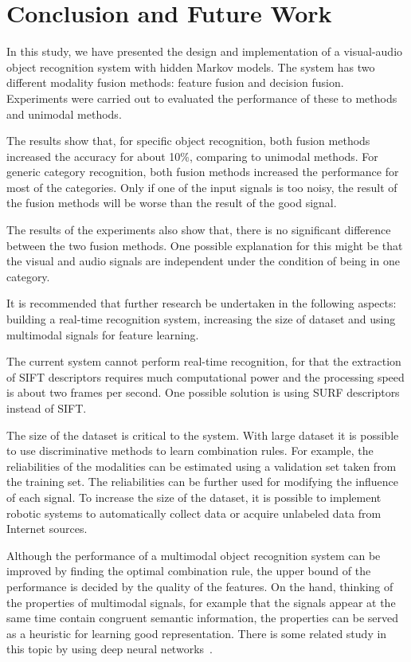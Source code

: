 \documentclass[12pt,final,twoside]{report}
\begin{document}
\cleardoublepage
\chapter{Conclusion and Future Work}
\label{ch:conclusion}
In this study, we have presented the design and implementation of a visual-audio object recognition system with hidden Markov models. The system has two different modality fusion methods: feature fusion and decision fusion. Experiments were carried out to evaluated the performance of these to methods and unimodal methods.

The results show that, for specific object recognition, both fusion methods increased the accuracy for about 10\%, comparing to unimodal methods. For generic category recognition, both fusion methods increased the performance for most of the categories. Only if one of the input signals is too noisy, the result of the fusion methods will be worse than the result of the good signal. 

The results of the experiments also show that, there is no significant difference between the two fusion methods. One possible explanation for this might be that the visual and audio signals are independent under the condition of being in one category.

It is recommended that further research be undertaken in the following aspects: building a real-time recognition system, increasing the size of dataset and using multimodal signals for feature learning.

The current system cannot perform real-time recognition, for that the extraction of SIFT descriptors requires much computational power and the processing speed is about two frames per second. One possible solution is using SURF descriptors instead of SIFT.

The size of the dataset is critical to the system. With large dataset it is possible to use discriminative methods to learn combination rules. For example, the reliabilities of the modalities can be estimated using a validation set taken from the training set. The reliabilities can be further used for modifying the influence of each signal. To increase the size of the dataset, it is possible to implement robotic systems to automatically collect data or acquire unlabeled data from Internet sources.

Although the performance of a multimodal object recognition system can be improved by finding the optimal combination rule, the upper bound of the performance is decided by the quality of the features. On the hand, thinking of the properties of multimodal signals, for example that the signals appear at the same time contain congruent semantic information, the properties can be served as a heuristic for learning good representation. There is some related study in this topic by using deep neural networks~\cite{ngiam_multimodal_2011}.
\end{document}
